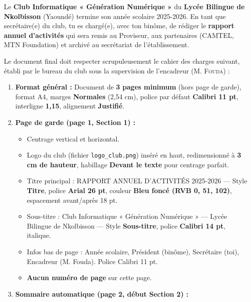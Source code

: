 \documentclass[11pt]{article}
\begin{document}
\begin{experience}
Le \textbf{Club Informatique « Génération Numérique »} du \textbf{Lycée Bilingue de Nkolbisson} (Yaoundé) termine son année scolaire 2025-2026. En tant que secrétaire(e) du club, tu es chargé(e), avec ton binôme, de rédiger le \textbf{rapport annuel d'activités} qui sera remis au Proviseur, aux partenaires (CAMTEL, MTN Foundation) et archivé au secrétariat de l'établissement.

Le document final doit respecter scrupuleusement le cahier des charges suivant, établi par le bureau du club sous la supervision de l'encadreur (M. \textsc{Fouda}) :
\end{experience}

\begin{exemplebox}
\begin{enumerate}
    \item \textbf{Format général :} Document de \textbf{3 pages minimum} (hors page de garde), format A4, marges \textbf{Normales} (2,54 cm), police par défaut \textbf{Calibri 11 pt}, interligne \textbf{1,15}, alignement \textbf{Justifié}.
    \item \textbf{Page de garde (page 1, Section 1) :}
    \begin{itemize}
        \item Centrage vertical et horizontal.
        \item Logo du club (fichier \texttt{logo\_club.png}) inséré en haut, redimensionné à \textbf{3 cm de hauteur}, habillage \textbf{Devant le texte} pour centrage parfait.
        \item Titre principal : \og RAPPORT ANNUEL D'ACTIVITÉS 2025-2026 \fg{} — Style \textbf{Titre}, police \textbf{Arial 26 pt}, couleur \textbf{Bleu foncé (RVB 0, 51, 102)}, espacement avant/après 18 pt.
        \item Sous-titre : \og Club Informatique « Génération Numérique » — Lycée Bilingue de Nkolbisson \fg{} — Style \textbf{Sous-titre}, police \textbf{Calibri 14 pt}, italique.
        \item Infos bas de page : Année scolaire, Président (binôme), Secrétaire (toi), Encadreur (M. Fouda). Police Calibri 11 pt.
        \item \textbf{Aucun numéro de page} sur cette page.
    \end{itemize}
    \item \textbf{Sommaire automatique (page 2, début Section 2) :}

\end{enumerate}
\end{exemplebox}
\end{document}
